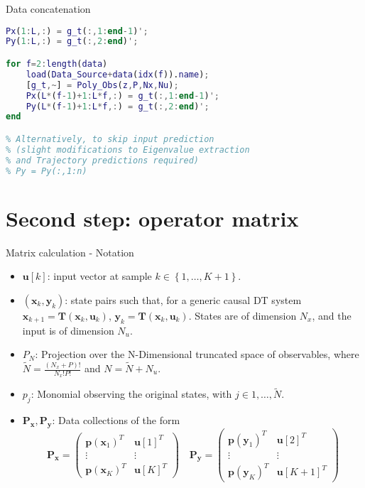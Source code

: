 \documentclass{beamer}
\begin{document}
\begin{frame}[fragile]{Data concatenation}
    \begin{lstlisting}[language=Matlab]
Px(1:L,:) = g_t(:,1:end-1)';
Py(1:L,:) = g_t(:,2:end)';

for f=2:length(data)
    load(Data_Source+data(idx(f)).name);
    [g_t,~] = Poly_Obs(z,P,Nx,Nu);
    Px(L*(f-1)+1:L*f,:) = g_t(:,1:end-1)';
    Py(L*(f-1)+1:L*f,:) = g_t(:,2:end)';
end

% Alternatively, to skip input prediction
% (slight modifications to Eigenvalue extraction
% and Trajectory predictions required)
% Py = Py(:,1:n)
    \end{lstlisting}
\end{frame}


\section{Second step: operator matrix}

\begin{frame}{Matrix calculation - Notation}
    \begin{itemize}
        \item $\mathbf{u}\left[k\right]$: input vector at sample $k \in \left\{1,\dots,K+1\right\}$.
        \item $\left(\mathbf{x}_k,\mathbf{y}_k\right)$: state pairs such that, for a generic causal DT system $\mathbf{x}_{k+1} = \mathbf{T}(\mathbf{x}_k , \mathbf{u}_k)$, $\mathbf{y}_k = \mathbf{T}(\mathbf{x}_k, \mathbf{u}_k)$. States are of dimension $N_x$, and the input is of dimension $N_u$.
        \item $P_N$: Projection over the N-Dimensional truncated space of observables, where $\tilde{N} = \frac{\left(N_x + P\right)!}{N_x! P!}$ and $N = \tilde{N} + N_u$.
        \item $p_j$: Monomial observing the original states, with $j \in {1,\dots,\tilde{N}}$.
        \item $\mathbf{P_x},\mathbf{P_y}$: Data collections of the form
            \begin{equation}
                \mathbf{P_x} = 
                \begin{pmatrix}
                    \mathbf{p}\left(\mathbf{x}_1\right)^T   &   \mathbf{u}\left[1\right]^T  \\
                    \vdots  &   \vdots  \\
                    \mathbf{p}\left(\mathbf{x}_K\right)^T   &   \mathbf{u}\left[K\right]^T
                \end{pmatrix}
                \quad
                \mathbf{P_y} = 
                \begin{pmatrix}
                    \mathbf{p}\left(\mathbf{y}_1\right)^T   &   \mathbf{u}\left[2\right]^T  \\
                    \vdots  &   \vdots  \\
                    \mathbf{p}\left(\mathbf{y}_K\right)^T   &   \mathbf{u}\left[K+1\right]^T
                \end{pmatrix}
            \end{equation}
    \end{itemize}
\end{frame}
\end{document}
